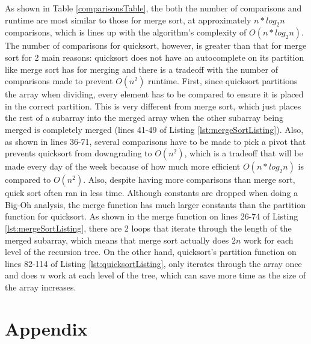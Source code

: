 \documentclass[letterpaper, 10pt,DIV=13]{scrartcl}
\numberwithin{equation}{section} %
\numberwithin{figure}{section} %
\numberwithin{table}{section} %
\begin{document}
As shown in Table \ref{comparisonsTable}, the both the number of comparisons and runtime are most similar to those for merge sort, at approximately $n * log_2n$ comparisons, which is lines up with the algorithm's complexity of $O(n * log_2n)$. The number of comparisons for quicksort, however, is greater than that for merge sort for 2 main reasons: quicksort does not have an autocomplete on its partition like merge sort has for merging and there is a tradeoff with the number of comparisons made to prevent $O(n^2)$ runtime. First, since quicksort partitions the array when dividing, every element has to be compared to ensure it is placed in the correct partition. This is very different from merge sort, which just places the rest of a subarray into the merged array when the other subarray being merged is completely merged (lines 41-49 of Listing \ref{lst:mergeSortListing}). Also, as shown in lines 36-71, several comparisons have to be made to pick a pivot that prevents quicksort from downgrading to $O(n^2)$, which is a tradeoff that will be made every day of the week because of how much more efficient $O(n * log_2n)$ is compared to $O(n^2)$. Also, despite having more comparisons than merge sort, quick sort often ran in less time. Although constants are dropped when doing a Big-Oh analysis, the merge function has much larger constants than the partition function for quicksort. As shown in the merge function on lines 26-74 of Listing \ref{lst:mergeSortListing}, there are 2 loops that iterate through the length of the merged subarray, which means that merge sort actually does $2n$ work for each level of the recursion tree. On the other hand, quicksort's partition function on lines 82-114 of Listing \ref{lst:quicksortListing}, only iterates through the array once and does $n$ work at each level of the tree, which can save more time as the size of the array increases.

\section{Appendix}
\end{document}
